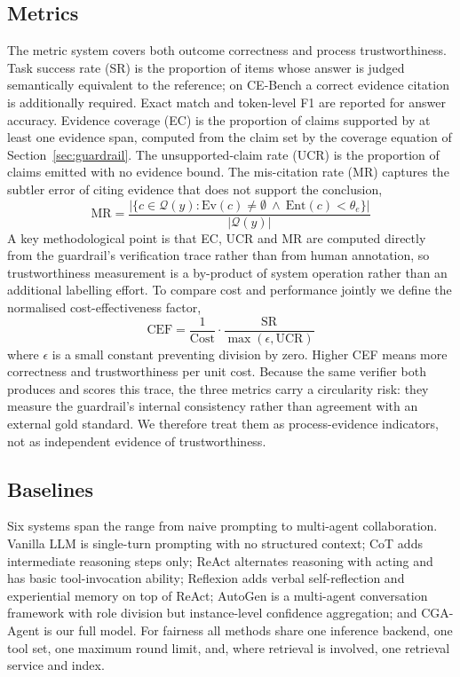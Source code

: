 \documentclass[journal,10pt,a4paper]{IEEEtran}
\begin{document}
\subsection{Metrics}
The metric system covers both outcome correctness and process trustworthiness. Task success rate (SR) is the proportion of items whose answer is judged semantically equivalent to the reference; on CE-Bench a correct evidence citation is additionally required. Exact match and token-level F1 are reported for answer accuracy. Evidence coverage (EC) is the proportion of claims supported by at least one evidence span, computed from the claim set by the coverage equation of Section~\ref{sec:guardrail}. The unsupported-claim rate (UCR) is the proportion of claims emitted with no evidence bound. The mis-citation rate (MR) captures the subtler error of citing evidence that does not support the conclusion,
\begin{equation}
\mathrm{MR}=\frac{\lvert\{c\in\mathcal{Q}(y):\mathrm{Ev}(c)\neq\emptyset\ \wedge\ \mathrm{Ent}(c)<\theta_e\}\rvert}{\lvert\mathcal{Q}(y)\rvert}
\end{equation}
A key methodological point is that EC, UCR and MR are computed directly from the guardrail's verification trace rather than from human annotation, so trustworthiness measurement is a by-product of system operation rather than an additional labelling effort. To compare cost and performance jointly we define the normalised cost-effectiveness factor,
\begin{equation}
\mathrm{CEF}=\frac{1}{\mathrm{Cost}}\cdot\frac{\mathrm{SR}}{\max(\epsilon,\mathrm{UCR})}
\end{equation}
where $\epsilon$ is a small constant preventing division by zero. Higher CEF means more correctness and trustworthiness per unit cost. Because the same verifier both produces and scores this trace, the three metrics carry a circularity risk: they measure the guardrail's internal consistency rather than agreement with an external gold standard. We therefore treat them as process-evidence indicators, not as independent evidence of trustworthiness.

\subsection{Baselines}
Six systems span the range from naive prompting to multi-agent collaboration. Vanilla LLM is single-turn prompting with no structured context; CoT adds intermediate reasoning steps only; ReAct alternates reasoning with acting and has basic tool-invocation ability; Reflexion adds verbal self-reflection and experiential memory on top of ReAct; AutoGen is a multi-agent conversation framework with role division but instance-level confidence aggregation; and CGA-Agent is our full model. For fairness all methods share one inference backend, one tool set, one maximum round limit, and, where retrieval is involved, one retrieval service and index.
\end{document}
